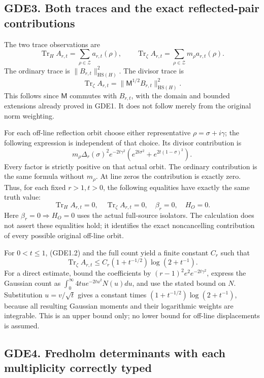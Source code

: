 \subsection{GDE3. Both traces and the exact reflected-pair
contributions}\label{gde3.-both-traces-and-the-exact-reflected-pair-contributions}

The two trace observations are \[
\boxed{\operatorname{Tr}_H A_{r,t}
=\sum_{\rho\in\mathscr Z}a_{r,t}(\rho),\qquad
\operatorname{Tr}_{\zeta}A_{r,t}
=\sum_{\rho\in\mathscr Z}m_\rho a_{r,t}(\rho).}
\tag{GDE3.1}
\] The ordinary trace is \(\|B_{r,t}\|_{\mathrm{HS}(H)}^2\). The divisor
trace is \[
\operatorname{Tr}_{\zeta}A_{r,t}
=\|\mathsf M^{1/2}B_{r,t}\|_{\mathrm{HS}(H)}^2.
\tag{GDE3.2}
\] This follows since \(\mathsf M\) commutes with \(B_{r,t}\), with the
domain and bounded extensions already proved in GDE1. It does not follow
merely from the original norm weighting.

For each off-line reflection orbit choose either representative
\(\rho=\sigma+i\gamma\); the following expression is independent of that
choice. Its divisor contribution is \[
\boxed{m_\rho\Delta_r(\sigma)^2e^{-2t\gamma^2}
\left(e^{2t\sigma^2}+e^{2t(1-\sigma)^2}\right).}
\tag{GDE3.3}
\] Every factor is strictly positive on that actual orbit. The ordinary
contribution is the same formula without \(m_\rho\). At line zeros the
contribution is exactly zero. Thus, for each fixed \(r>1,t>0\), the
following equalities have exactly the same truth value: \[
\operatorname{Tr}_H A_{r,t}=0,\quad
\operatorname{Tr}_{\zeta}A_{r,t}=0,\quad
\beta_r=0,\quad H_O=0.
\tag{GDE3.4}
\] Here \(\beta_r=0\Rightarrow H_O=0\) uses the actual full-source
isolators. The calculation does not assert these equalities hold; it
identifies the exact noncancelling contribution of every possible
original off-line orbit.

For \(0<t\le1\), (GDE1.2) and the full count yield a finite constant
\(C_r\) such that \[
\operatorname{Tr}_{\zeta}A_{r,t}
\le C_r(1+t^{-1/2})\log(2+t^{-1}).
\tag{GDE3.5}
\] For a direct estimate, bound the coefficients by
\((r-1)^2e^2e^{-2t\gamma^2}\), express the Gaussian count as
\(\int_0^\infty4tu e^{-2tu^2}N(u)du\), and use the stated bound on
\(N\). Substitution \(u=v/\sqrt t\) gives a constant times
\((1+t^{-1/2})\log(2+t^{-1})\), because all resulting Gaussian moments
and their logarithmic weights are integrable. This is an upper bound
only; no lower bound for off-line displacements is assumed.

\subsection{GDE4. Fredholm determinants with each multiplicity correctly
typed}\label{gde4.-fredholm-determinants-with-each-multiplicity-correctly-typed}

